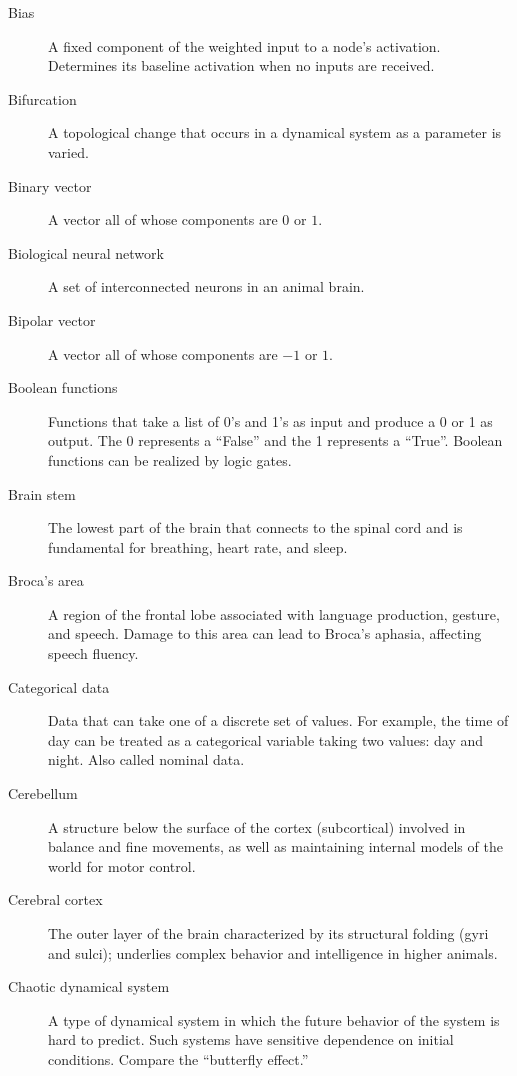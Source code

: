 \begin{description}
\item[Bias] A fixed component of the weighted input to a node's activation. Determines its baseline activation when no inputs are received.

\item[Bifurcation] A topological change that occurs in a dynamical system as a parameter is varied.

\item[Binary vector] A vector all of whose components are $0$ or $1$.

\item[Biological neural network] A set of interconnected neurons in an animal brain.

\item[Bipolar vector] A vector all of whose components are $-1$ or $1$.

\item[Boolean functions] Functions that take a list of 0's and 1's as input and produce a 0 or 1 as output. The 0 represents a ``False'' and the 1 represents a ``True''. Boolean functions can be realized by logic gates.

\item[Brain stem] The lowest part of the brain that connects to the spinal cord and is fundamental for breathing, heart rate, and sleep.

\item[Broca's area] A region of the frontal lobe associated with language production, gesture, and speech. Damage to this area can lead to Broca's aphasia, affecting speech fluency.

\item[Categorical data] Data that can take one of a discrete set of values. For example, the time of day can be treated as a categorical variable taking two values: day and night. Also called nominal data.

\item[Cerebellum] A structure below the surface of the cortex (subcortical) involved in balance and fine movements, as well as maintaining internal models of the world for motor control.

\item[Cerebral cortex] The outer layer of the brain characterized by its structural folding (gyri and sulci); underlies complex behavior and intelligence in higher animals. 

\item[Chaotic dynamical system] A type of dynamical system in which the future behavior of the system is hard to predict. Such systems have sensitive dependence on initial conditions. Compare the ``butterfly effect.''


\end{description}
